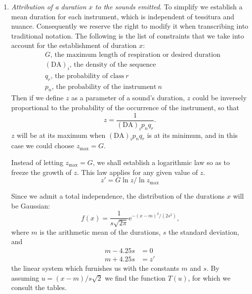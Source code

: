 \documentclass[letterpaper, 11pt]{article}
\begin{document}
\begin{enumerate}
        Thus for \( (\mathrm{DA})_i = 145 \) sounds/sec.
        \begin{align*}
            a &= 53.2 \ \text{semitones/sec.} \\
            2s &= 75 \ \text{semitones/sec.}
        \end{align*}
        and for \( (\mathrm{DA})_i = 0.13 \) sounds/sec.
        \begin{align*}
            a &= 17.7 \ &\text{semitones/sec.} \\
            2s &= 25 \ &\text{semitones/sec.}
        \end{align*}
    \item
        \textit{Attribution of a duration \( x \) to the sounds emitted}. To simplify we establish a
        mean duration for each instrument, which is independent of tessitura and nuance.
        Consequently we reserve the right to modify it when transcribing into traditional notation.
        The following is the list of constraints that we take into account for the establishment of
        duration \( x \):
        \begin{align*}
            &G \text{, the maximum length of respiration or desired duration} \\
            &(\mathrm{DA})_i \text{, the density of the sequence} \\
            &q_r \text{, the probability of class} \ r \\
            &p_n \text{, the probability of the instrument} \ n
        \end{align*}
        Then if we define \( z \) as a parameter of a sound's duration, \( z \) could be inversely
        proportional to the probability of the occurrence of the instrument, so that
        \[ z = \frac{1}{(\mathrm{DA})_i p_n q_r} . \]
        \( z \) will be at its maximum when \( (\mathrm{DA})_i p_n q_r \) is at its minimum, and in
        this case we could choose \( z_{\textrm{max}} = G \).

        Instead of letting \( z_{\textrm{max}} = G \), we shall establish a logarithmic law so as to
        freeze the growth of \( z \). This law applies for any given value of \( z \).
        \[ z' = G \ln{z} / \ln{z_\textrm{max}} \]

        Since we admit a total independence, the distribution of the durations \( x \) will be
        Gaussian:
        \[ f(x) = \frac{1}{s \sqrt{2 \pi}} \mathrm{e}^{-(x - m)^2/(2s^2)} \text{,} \]
        where \( m \) is the arithmetic mean of the durations, \( s \) the standard deviation, and
        \begin{align*}
            m - 4.25s &= 0 \\
            m + 4.25s &= z'
        \end{align*}
        the linear system which furnishes us with the constants \( m \) and \( s \). By assuming
        \(u = (x-m)/s\sqrt{2} \) we find the function \( T(u) \), for which we consult the tables.


\end{enumerate}
\end{document}
